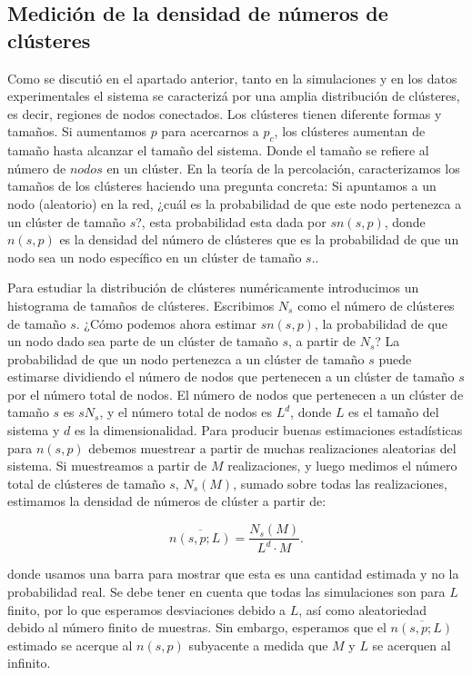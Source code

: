 \subsection{Medición de la densidad de números de clústeres}\label{sec:medicion_clusteres}

Como se discutió en el apartado anterior, tanto  en la simulaciones  y en los datos experimentales  el sistema se caracterizá por una amplia distribución de clústeres, es decir, regiones de nodos conectados. Los clústeres tienen diferente formas y tamaños. Si aumentamos $p$ para acercarnos a $p_c$,  los clústeres aumentan de tamaño hasta alcanzar el tamaño del sistema. Donde el tamaño se refiere al número de $nodos$ en un clúster.  En la teoría de la percolación, caracterizamos los tamaños de los clústeres haciendo una pregunta concreta: Si apuntamos a un nodo (aleatorio) en la red, ¿cuál es la probabilidad de que este nodo pertenezca a un clúster de tamaño $s$?,  esta probabilidad esta dada por $sn(s,p)$, donde $n(s,p)$ es la densidad del número de clústeres  que es la probabilidad de que un nodo sea un nodo específico en un clúster de tamaño $s$.\cite{percolacion_python}.

Para estudiar  la distribución de clústeres numéricamente  introducimos un histograma de tamaños de clústeres. Escribimos $N_s$ como el número de clústeres de tamaño $s$.  ¿Cómo podemos ahora estimar $sn(s, p)$, la probabilidad de que un nodo dado sea parte de un clúster de tamaño $s$, a partir de $N_s$? La probabilidad de que un nodo pertenezca a un clúster de tamaño $s$ puede estimarse dividiendo el número de nodos que pertenecen a un clúster de tamaño $s$ por el número total de nodos. El número de nodos que pertenecen a un clúster de tamaño $s$ es $sN_s$, y el número total de nodos es $L^d$, donde $L$ es el tamaño del sistema y $d$ es la dimensionalidad. Para producir buenas estimaciones estadísticas para $n(s, p)$ debemos muestrear a partir de muchas realizaciones aleatorias del sistema. Si muestreamos a partir de $M$ realizaciones, y luego medimos el número total de clústeres de tamaño $s$, $N_s(M)$, sumado sobre todas las realizaciones, estimamos la densidad de números de clúster a partir de: 

\begin{equation}\label{eq:88}
\overline{n(s,p;L)}=\frac{N_s(M)}{L^d\cdot M}.
\end{equation}

donde usamos una barra para mostrar que esta es una cantidad estimada y no la probabilidad real. Se debe tener  en cuenta que todas las simulaciones son para $L$ finito, por lo que esperamos desviaciones debido a $L$, así como aleatoriedad debido al número finito de muestras. Sin embargo, esperamos que el $\overline{n(s, p; L)}$ estimado se acerque al $n(s, p)$ subyacente a medida que $M$ y $L$ se acerquen al infinito.



